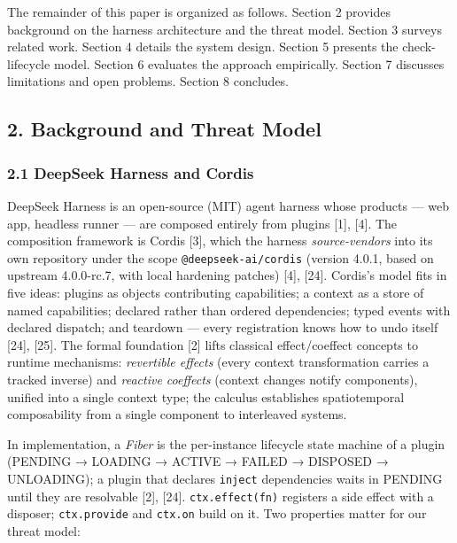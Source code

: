 \documentclass[
]{article}
\begin{document}
The remainder of this paper is organized as follows. Section 2 provides
background on the harness architecture and the threat model. Section 3
surveys related work. Section 4 details the system design. Section 5
presents the check-lifecycle model. Section 6 evaluates the approach
empirically. Section 7 discusses limitations and open problems. Section
8 concludes.


\subsection{2. Background and Threat
Model}\label{background-and-threat-model}

\subsubsection{2.1 DeepSeek Harness and
Cordis}\label{deepseek-harness-and-cordis}

DeepSeek Harness is an open-source (MIT) agent harness whose products
--- web app, headless runner --- are composed entirely from plugins
{[}1{]}, {[}4{]}. The composition framework is Cordis {[}3{]}, which the
harness \emph{source-vendors} into its own repository under the scope
\texttt{@deepseek-ai/cordis} (version 4.0.1, based on upstream
4.0.0-rc.7, with local hardening patches) {[}4{]}, {[}24{]}. Cordis's
model fits in five ideas: plugins as objects contributing capabilities;
a context as a store of named capabilities; declared rather than ordered
dependencies; typed events with declared dispatch; and teardown ---
every registration knows how to undo itself {[}24{]}, {[}25{]}. The
formal foundation {[}2{]} lifts classical effect/coeffect concepts to
runtime mechanisms: \emph{revertible effects} (every context
transformation carries a tracked inverse) and \emph{reactive coeffects}
(context changes notify components), unified into a single context type;
the calculus establishes spatiotemporal composability from a single
component to interleaved systems.

In implementation, a \emph{Fiber} is the per-instance lifecycle state
machine of a plugin (PENDING → LOADING → ACTIVE → FAILED → DISPOSED →
UNLOADING); a plugin that declares \texttt{inject} dependencies waits in
PENDING until they are resolvable {[}2{]}, {[}24{]}.
\texttt{ctx.effect(fn)} registers a side effect with a disposer;
\texttt{ctx.provide} and \texttt{ctx.on} build on it. Two properties
matter for our threat model:
\end{document}
